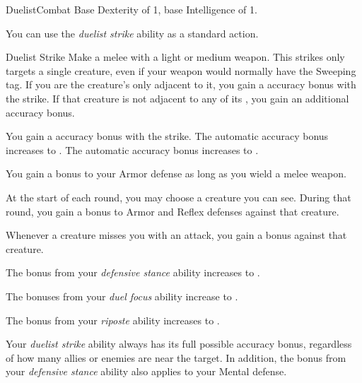     \begin{feat}{Duelist}{Combat}
        \featpre Base Dexterity of 1, base Intelligence of 1.

         You can use the \textit{duelist strike} ability as a standard action.
        \begin{freeability}{Duelist Strike}
            Make a melee  with a light or medium weapon.
            This strikes only targets a single creature, even if your weapon would normally have the Sweeping tag.
            If you are the creature's only  adjacent to it, you gain a  accuracy bonus with the strike.
            If that creature is not adjacent to any of its , you gain an additional  accuracy bonus.

            \rankline
             You gain a  accuracy bonus with the strike.
             The automatic accuracy bonus increases to .
             The automatic accuracy bonus increases to .
        \end{freeability}

         You gain a  bonus to your Armor defense as long as you wield a melee weapon.

         At the start of each round, you may choose a creature you can see.
        During that round, you gain a  bonus to Armor and Reflex defenses against that creature.

         Whenever a creature misses you with an attack, you  gain a   bonus against that creature.

         The bonus from your \textit{defensive stance} ability increases to .

         The bonuses from your \textit{duel focus} ability increase to .

         The bonus from your \textit{riposte} ability increases to .

         Your \textit{duelist strike} ability always has its full possible accuracy bonus, regardless of how many allies or enemies are near the target.
        In addition, the bonus from your \textit{defensive stance} ability also applies to your Mental defense.
    \end{feat}

